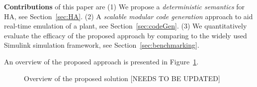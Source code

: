  
 \textbf{Contributions} of this paper are 
 (1) We propose a \emph{deterministic semantics} for \acf{HA}, see Section~\ref{sec:HA}.
 (2) A \emph{scalable modular code generation} approach 
 to aid real-time emulation of a plant, see Section~\ref{sec:codeGen}.
  (3) We quantitatively evaluate the efficacy of the 
  proposed approach by comparing  
   to the widely used Simulink\textsuperscript{\textregistered}
   simulation framework, see Section~\ref{sec:benchmarking}.
   
 An overview of the proposed approach is presented
 in Figure~\ref{fig:overview}.
 
 \begin{figure}[bthp]
 	\centering
 	\scalebox{0.7}{
	 
	}
	 \caption{Overview of the proposed solution 
	 	[NEEDS TO BE UPDATED] \label{fig:overview}}
\end{figure}
      
 
 
